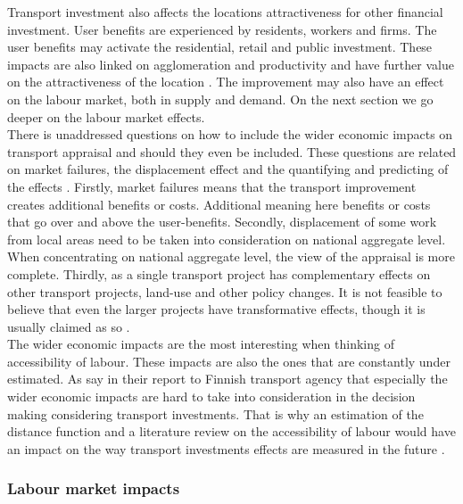 \documentclass[a4paper, 12 pt]{article}   	%
\begin{document}
Transport investment also affects the locations attractiveness for other financial investment. User benefits are experienced by residents, workers and firms. The user benefits may activate the residential, retail and public investment. These impacts are also linked on agglomeration and productivity and have further value on the attractiveness of the location \citep{venables2017}. The improvement may also have an effect on the labour market, both in supply and demand. On the next section we go deeper on the labour market effects. \\

There is unaddressed questions on how to include the wider economic impacts on transport appraisal and should they even be included. These questions are related on market failures, the displacement effect and the quantifying and predicting of the effects \citep{venables2017}. Firstly, market failures means that the transport improvement creates additional benefits or costs. Additional meaning here benefits or costs that go over and above the user-benefits. Secondly, displacement of some work from local areas need to be taken into consideration on national aggregate level. When concentrating on national aggregate level, the view of the appraisal is more complete. Thirdly, as a single transport project has complementary effects on other transport projects, land-use and other policy changes. It is not feasible to believe that even the larger projects have transformative effects, though it is usually claimed as so \citep{venables2017}. \\

The wider economic impacts are the most interesting when thinking of accessibility of labour. These impacts are also the ones that are constantly under estimated.  As \cite{laakso} say in their report to Finnish transport agency that especially the wider economic impacts are hard to take into consideration in the decision making considering transport investments. That is why an estimation of the distance function and a literature review on the accessibility of labour would have an impact on the way transport investments effects are measured in the future \citep{laakso}.\\


\subsubsection{Labour market impacts}
\end{document}
